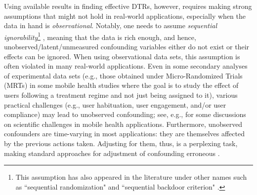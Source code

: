 \documentclass[opre,nonblindrev]{informs2}%
\newcommand{\1}{\hbox{\rm 1\kern-.35em 1}}
\begin{document}
Using available results in finding effective DTRs, however, requires making strong assumptions that might not hold in real-world applications, especially when the data  in hand  is  {\em observational}.  Notably, one needs to assume {\em sequential ignorability}\footnote{This assumption has also appeared in the literature under other names such as ``sequential randomization" \citep{Tsiatis2019} and ``sequential backdoor criterion" \citep{PearlRobins1995}.} \citep{Robins1986, Robins1997, Murphy2001, Murphy2003, Robins2004}, meaning that the data  is rich enough, and hence, unobserved/latent/unmeasured confounding variables either do not exist or their effects can be ignored.   When using observational data sets, this assumption is often violated in many real-world applications.  Even in some secondary analyses of experimental data sets (e.g., those obtained under Micro-Randomized Trials (MRTs)  in some mobile health studies where the goal is to study the effect of users following a treatment regime and not just being assigned to it), various practical challenges (e.g., user habituation,  user engagement, and/or user compliance) may lead to unobserved confounding; see, e.g., \cite{Saghafian2021} for some discussions on scientific challenges in mobile health applications. Furthermore, unobserved confounders are time-varying in most applications: they are themselves affected by the previous actions taken. Adjusting for them, thus, is a perplexing task, making standard approaches for adjustment of confounding erroneous \citep[see, e.g.,][]{Robins2000}.
\end{document}
